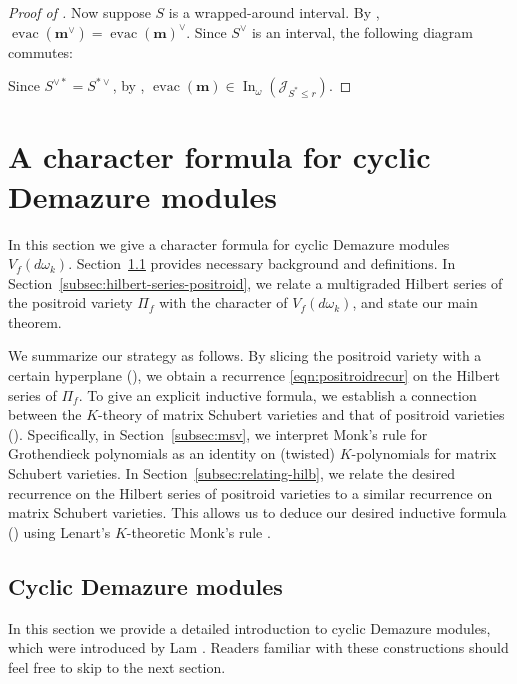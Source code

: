 \documentclass[12pt,reqno]{amsart}
\theoremstyle{definition}
\newcommand{\inn}{\operatorname{In}}
\newcommand{\evac}
{\operatorname{evac}}
\newcommand{\mm}{\mathbf m}
\newcommand{\cJ}{\mathcal{J}}
\begin{document}
{\begin{proof}[Proof of ]
Now suppose $S$ is a wrapped-around interval. By , $\evac(\mm^\vee) = \evac(\mm)^\vee$. Since $S^\vee$ is an interval, the following diagram commutes:
\begin{center}
\end{center}
Since $S^{\vee *} = S^{*\vee}$, by , $\evac(\mm) \in \inn_\omega(\cJ_{S^{*}\leq r})$. 
\end{proof}

\section{A character formula for cyclic Demazure modules}
\label{sec:cyclic_demazure}

In this section we give a character formula for cyclic Demazure modules $V_{f}(d\omega_k)$. Section~\ref{subsec:cyclic_demazure_def} provides necessary background and definitions. In Section~\ref{subsec:hilbert-series-positroid},
 we relate a multigraded Hilbert series of the positroid variety $\Pi_f$ with the character of $V_f(d\omega_k)$, and state our main theorem. 

We summarize our strategy as follows. 
By slicing the positroid variety with a certain hyperplane (), we obtain a recurrence \eqref{eqn:positroidrecur} on the Hilbert series of $\Pi_f$. 
To give an explicit inductive formula, we establish a connection between the $K$-theory of matrix Schubert varieties and that of positroid varieties (). Specifically, in Section~\ref{subsec:msv}, we interpret Monk's rule for Grothendieck polynomials as an identity on (twisted) $K$-polynomials for matrix Schubert varieties. In Section~\ref{subsec:relating-hilb}, we relate the desired recurrence on the Hilbert series of positroid varieties to a similar recurrence on matrix Schubert varieties. This allows us to deduce our desired inductive formula () using Lenart's $K$-theoretic Monk's rule \cite{lenart2003k}.


\subsection{Cyclic Demazure modules}
\label{subsec:cyclic_demazure_def}
In this section we provide a detailed introduction to cyclic Demazure modules, which were introduced by Lam \cite{Lam19}. Readers familiar with these constructions should feel free to skip to the next section.

}
\end{document}
